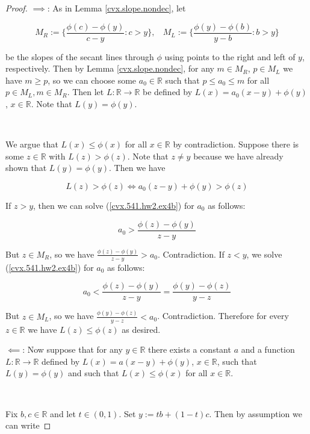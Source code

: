 \begin{proof} \(\implies\): As in Lemma \ref{cvx.slope.nondec}, let 

\[
M_R:= \{ \frac{\phi(c) - \phi(y) }{c-y}  : c > y\}, \ \ \ \ M_L:= \{ \frac{\phi(y) - \phi(b) }{y - b}  : b > y\}
\]

be the slopes of the secant lines through \(\phi\) using points to the right and left of \(y\), respectively. Then by Lemma \ref{cvx.slope.nondec}, for any \(m \in M_R\), \(p \in M_L\) we have \(m \geq p\), so we can choose some \(a_0 \in \mathbb{R}\) such that \(p \leq a_0 \leq m\) for all \(p \in M_L, m \in M_R\). Then let $L:\mathbb{R}\to\mathbb{R}$ be defined by $L(x)=a_0(x-y)+\phi(y)$, $x\in\mathbb{R}$. Note that $L(y)=\phi(y)$. 

\

We argue that $L(x)\leq\phi(x)$ for all $x\in\mathbb{R}$ by contradiction. Suppose there is some \(z \in \mathbb{R}\) with \(L(z) > \phi(z)\). Note that \( z \neq y\) because we have already shown that \(L(y) = \phi(y)\). Then we have


\begin{equation}\label{cvx.541.hw2.ex4b}
L(z) > \phi(z) \iff a_0(z-y)+\phi(y) > \phi(z) 
\end{equation}

If \(z > y\), then we can solve (\ref{cvx.541.hw2.ex4b}) for \(a_0\) as follows:

\[
a_0 >  \frac{\phi(z) - \phi(y)}{z-y}
\]

But \(z \in M_R\), so we have \( \frac{\phi(z) - \phi(y) }{z-y} > a_0 \). Contradiction. If \(z < y\), we solve (\ref{cvx.541.hw2.ex4b}) for \(a_0\) as follows:

\[
a_0 <  \frac{\phi(z) - \phi(y)}{z-y} = \frac{\phi(y) - \phi(z) }{y-z} 
\]

But \(z \in M_L\), so we have \( \frac{\phi(y) - \phi(z) }{y-z} < a_0 \). Contradiction. Therefore for every \(z \in \mathbb{R}\) we have \(L(z) \leq \phi(z)\) as desired.

\(\impliedby\): Now suppose that for any $y\in\mathbb{R}$ there exists a constant $a$ and a function $L:\mathbb{R}\to\mathbb{R}$ defined by $L(x)=a(x-y)+\phi(y)$, $x\in\mathbb{R}$, such that $L(y)=\phi(y)$ and such that $L(x)\leq\phi(x)$ for all $x\in\mathbb{R}$.

\

Fix \(b, c \in \mathbb{R}\) and let \(t \in (0,1)\). Set \(y:= tb + (1-t)c\). Then by assumption we can write


\end{proof}
